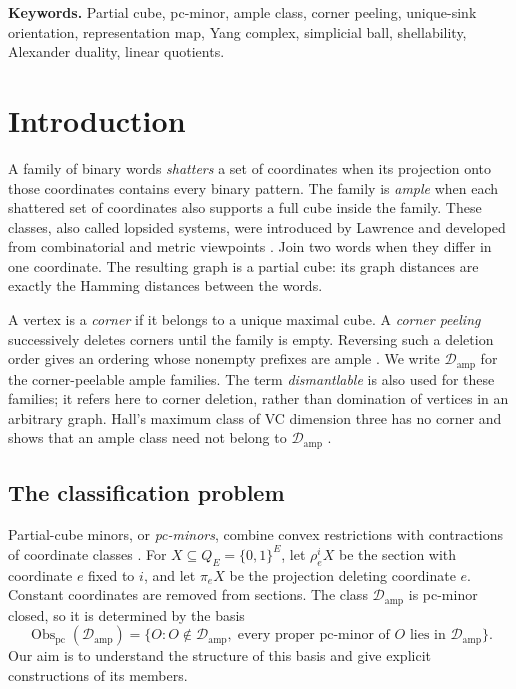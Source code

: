 \documentclass[11pt]{article}
\numberwithin{equation}{section}
\theoremstyle{definition}
\theoremstyle{remark}
\newcommand{\Damp}{\mathcal D_{\mathrm{amp}}}
\newcommand{\Obs}{\operatorname{Obs}_{\mathrm{pc}}}
\begin{document}
\medskip
\noindent\textbf{Keywords.}
Partial cube, pc-minor, ample class, corner peeling, unique-sink orientation,
representation map, Yang complex,
simplicial ball, shellability, Alexander duality, linear quotients.

\setcounter{tocdepth}{2}
\tableofcontents
\clearpage

\section{Introduction}
\label{sec:damp-introduction}

A family of binary words \emph{shatters} a set of coordinates when its
projection onto those coordinates contains every binary pattern.
The family is \emph{ample} when each shattered set of coordinates also
supports a full cube inside the family.  These classes, also called
lopsided systems, were introduced
by Lawrence and developed from combinatorial and metric viewpoints
\cite{Lawrence83,BandeltCDK06}.  Join two words when they differ in one
coordinate.  The resulting graph is a partial cube: its graph distances
are exactly the Hamming distances between the words.

A vertex is a \emph{corner} if it belongs to a unique maximal cube.
A \emph{corner peeling} successively deletes corners until the family
is empty.  Reversing such a deletion order gives an ordering whose
nonempty prefixes are ample
\cite[Proposition~4.2]{ChalopiChepoiMoran22}.  We write \(\Damp\)
for the corner-peelable ample families.  The term \emph{dismantlable}
is also used for these families; it refers here to corner deletion,
rather than domination of vertices in an arbitrary graph.  Hall's
maximum class of VC dimension three has no corner and shows that an
ample class need not belong to \(\Damp\)
\cite[Theorem~4.5]{ChalopiChepoiMoran22}.

\subsection{The classification problem}

Partial-cube minors, or \emph{pc-minors}, combine convex restrictions
with contractions of coordinate classes \cite{KnauerMarc20}.  For
\(X\subseteq Q_E=\{0,1\}^E\), let \(\rho_e^iX\) be the section
with coordinate \(e\) fixed to \(i\), and let \(\pi_eX\) be the
projection deleting coordinate \(e\).  Constant coordinates are removed
from sections.  The class \(\Damp\) is pc-minor closed, so it is
determined by the basis
\[
 \Obs(\Damp)=\{O:O\notin\Damp,\;
       \text{every proper pc-minor of }O\text{ lies in }\Damp\}.
\]
Our aim is to understand the structure of this basis and give explicit
constructions of its members.
\end{document}
